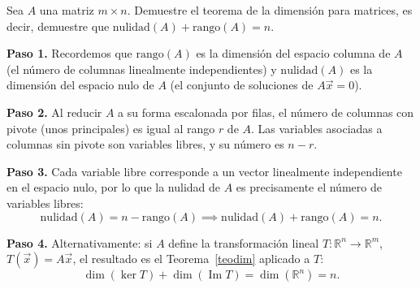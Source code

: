 \begin{prob}
Sea $A$ una matriz $m\times n$. Demuestre el teorema de la dimensión para matrices, es decir, demuestre que $\mathrm{nulidad}(A) + \mathrm{rango}(A) = n$.
\begin{myproof}
\textbf{Paso 1.} Recordemos que $\mathrm{rango}(A)$ es la dimensión del espacio columna de $A$ (el número de columnas linealmente independientes) y $\mathrm{nulidad}(A)$ es la dimensión del espacio nulo de $A$ (el conjunto de soluciones de $A\vec{x} = 0$).

\textbf{Paso 2.} Al reducir $A$ a su forma escalonada por filas, el número de columnas con pivote (unos principales) es igual al rango $r$ de $A$. Las variables asociadas a columnas sin pivote son variables libres, y su número es $n - r$.

\textbf{Paso 3.} Cada variable libre corresponde a un vector linealmente independiente en el espacio nulo, por lo que la nulidad de $A$ es precisamente el número de variables libres:
\[
\mathrm{nulidad}(A) = n - \mathrm{rango}(A)
\implies
\mathrm{nulidad}(A) + \mathrm{rango}(A) = n.
\]

\textbf{Paso 4.} Alternativamente: si $A$ define la transformación lineal $T: \mathbb{R}^n \to \mathbb{R}^m$, $T(\vec{x}) = A\vec{x}$, el resultado es el Teorema~\ref{teodim} aplicado a $T$:
\[
\dim(\ker T) + \dim(\operatorname{Im} T) = \dim(\mathbb{R}^n) = n.
\]
\end{myproof}
\end{prob}


